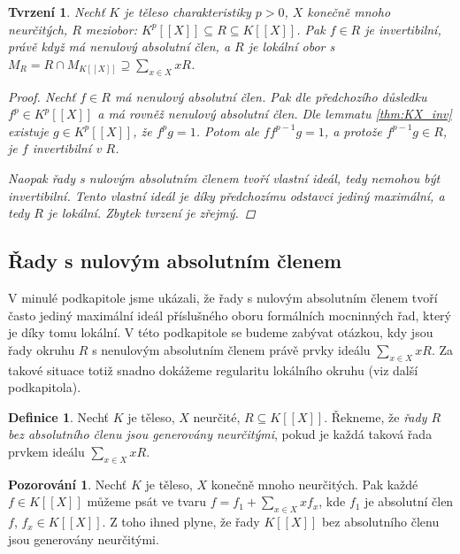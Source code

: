 \documentclass[11pt,a4paper]{article}
\newcounter{numb}
\theoremstyle{definition}
\newtheorem*{definice}{Definice}
\newtheorem{pozorovani}[numb]{Pozorování}
\theoremstyle{plain}
\newtheorem{tvrzeni}[numb]{Tvrzení}
\begin{document}
\begin{tvrzeni} \label{thm:R_loc}
	Nechť $K$ je těleso charakteristiky $p > 0$, $X$ konečně mnoho neurčitých, $R$ meziobor: $K^p[[X]] \subseteq R \subseteq K[[X]]$. Pak $f \in R$ je invertibilní, právě když má nenulový absolutní člen, a $R$ je lokální obor s $M_R = R \cap M_{K[[X]]} \supseteq \sum_{x \in X} x R$.

	\begin{proof}
		Nechť $f \in R$ má nenulový absolutní člen. Pak dle předchozího důsledku $f^p \in K^p[[X]]$ a má rovněž nenulový absolutní člen. Dle lemmatu \ref{thm:KX_inv} existuje $g \in K^p[[X]]$, že $f^p g = 1$. Potom ale $f f^{p - 1} g = 1$, a protože $f^{p - 1} g \in R$, je $f$ invertibilní v $R$.

		Naopak řady s nulovým absolutním členem tvoří vlastní ideál, tedy nemohou být invertibilní. Tento vlastní ideál je díky předchozímu odstavci jediný maximální, a tedy $R$ je lokální. Zbytek tvrzení je zřejmý.
	\end{proof}
\end{tvrzeni}


\subsection{Řady s nulovým absolutním členem}

V minulé podkapitole jsme ukázali, že řady s nulovým absolutním členem tvoří často jediný maximální ideál příslušného oboru formálních mocninných řad, který je díky tomu lokální. V této podkapitole se budeme zabývat otázkou, kdy jsou řady okruhu $R$ s nenulovým absolutním členem právě prvky ideálu $\sum_{x \in X} xR$. Za takové situace totiž snadno dokážeme regularitu lokálního okruhu (viz další podkapitola).

\newcommand*{\absOK}[1]{řady $#1$ bez absolutního členu jsou generovány neurčitými}
\begin{definice}
	Nechť $K$ je těleso, $X$ neurčité, $R \subseteq K[[X]]$. Řekneme, že \emph{\absOK{R}}, pokud je každá taková řada prvkem ideálu $\sum_{x \in X} xR$.
\end{definice}

\begin{pozorovani}
	Nechť $K$ je těleso, $X$ konečně mnoho neurčitých. Pak každé $f \in K[[X]]$ můžeme psát ve tvaru $f = f_1 + \sum_{x \in X} x f_x$, kde $f_1$ je absolutní člen $f$, $f_x \in K[[X]]$. Z toho ihned plyne, že \absOK{K[[X]]}.
\end{pozorovani}
\end{document}
